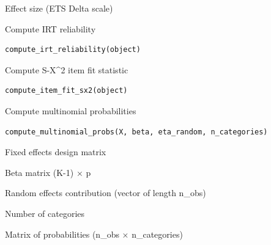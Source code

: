 \documentclass[a4paper]{book}
\begin{document}
%
\begin{Value}
Effect size (ETS Delta scale)
\end{Value}
%
\begin{Description}
Compute IRT reliability
\end{Description}
%
\begin{Usage}
\begin{verbatim}
compute_irt_reliability(object)
\end{verbatim}
\end{Usage}
%
\begin{Description}
Compute S-X\textasciicircum{}2 item fit statistic
\end{Description}
%
\begin{Usage}
\begin{verbatim}
compute_item_fit_sx2(object)
\end{verbatim}
\end{Usage}
%
\begin{Description}
Compute multinomial probabilities
\end{Description}
%
\begin{Usage}
\begin{verbatim}
compute_multinomial_probs(X, beta, eta_random, n_categories)
\end{verbatim}
\end{Usage}
%
\begin{Arguments}
\begin{ldescription}
\item[\code{X}] Fixed effects design matrix

\item[\code{beta}] Beta matrix (K-1) × p

\item[\code{eta\_random}] Random effects contribution (vector of length n\_obs)

\item[\code{n\_categories}] Number of categories
\end{ldescription}
\end{Arguments}
%
\begin{Value}
Matrix of probabilities (n\_obs × n\_categories)
\end{Value}
\end{document}
